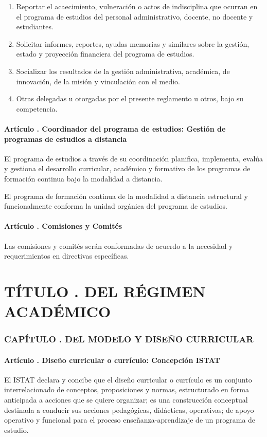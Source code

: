 \begin{enumerate}
\item Reportar el acaecimiento, vulneración o actos de indisciplina que ocurran en el programa de estudios del personal administrativo, docente, no docente y estudiantes. 
\item Solicitar informes, reportes, ayudas memorias y similares sobre la gestión, estado y proyección financiera del programa de estudios. 
\item Socializar los resultados de la gestión administrativa, académica, de innovación, de la misión y vinculación con el medio. 
\item Otras delegadas u otorgadas por el presente reglamento u otros, bajo su competencia. 
\end{enumerate}
\subsection{Artículo . Coordinador del programa de estudios: Gestión de programas de estudios a distancia}
\addtocounter{ns}{1}
El programa de estudios a través de su coordinación planifica, implementa, evalúa y gestiona el desarrollo curricular, académico y formativo de los programas de formación continua bajo la modalidad a distancia. 

El programa de formación continua de la modalidad a distancia estructural y funcionalmente conforma la unidad orgánica del programa de estudios. 
\subsection{Artículo . Comisiones y Comités}
\addtocounter{ns}{1}
Las comisiones y comités serán conformadas de acuerdo a la necesidad y requerimientos en directivas específicas.

\part{TÍTULO . DEL RÉGIMEN ACADÉMICO}
\addtocounter{ns}{1}
\section{CAPÍTULO . DEL MODELO Y DISEÑO CURRICULAR}
\addtocounter{re}{1}

\subsection{Artículo . Diseño curricular o currículo: Concepción ISTAT}
\addtocounter{ns}{1}
El ISTAT declara y concibe que el diseño curricular o currículo es un conjunto interrelacionado de conceptos, proposiciones y normas, estructurado en forma anticipada a acciones que se quiere organizar; es una construcción conceptual destinada a conducir sus acciones pedagógicas, didácticas, operativas; de apoyo operativo y funcional para el proceso enseñanza-aprendizaje de un programa de estudio. 

